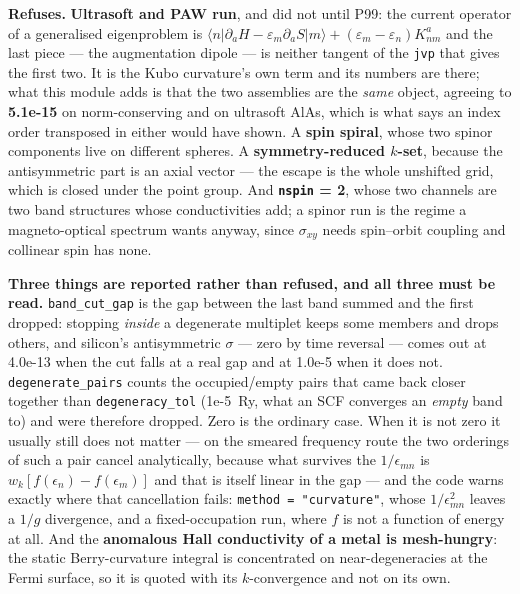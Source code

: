 \documentclass[11pt,a4paper]{article}
\newcommand{\code}[1]{\texttt{\small #1}}
\begin{document}
\begin{refuses}
\textbf{Refuses.} \textbf{Ultrasoft and PAW run}, and did not until P99: the
current operator of a generalised eigenproblem is $\langle n|\partial_a H -
\varepsilon_m \partial_a S|m\rangle + (\varepsilon_m-\varepsilon_n)K^a_{nm}$
and the last piece --- the augmentation dipole --- is neither tangent of the
\code{jvp} that gives the first two. It is the Kubo curvature's own term and
its numbers are there; what this module adds is that the two assemblies are the
\emph{same} object, agreeing to \textbf{5.1e-15} on norm-conserving and on
ultrasoft AlAs, which is what says an index order transposed in either would
have shown. A \textbf{spin spiral}, whose two spinor
components live on different spheres. A \textbf{symmetry-reduced $k$-set},
because the antisymmetric part is an axial vector --- the escape is the whole
unshifted grid, which is closed under the point group. And
\textbf{\code{nspin} = 2}, whose two channels are two band structures whose
conductivities add; a spinor run is the regime a magneto-optical spectrum wants
anyway, since $\sigma_{xy}$ needs spin--orbit coupling and collinear spin has
none.

\textbf{Three things are reported rather than refused, and all three must be
read.} \code{band\_cut\_gap} is the gap between the last band summed and the
first dropped: stopping \emph{inside} a degenerate multiplet keeps some members
and drops others, and silicon's antisymmetric $\sigma$ --- zero by time
reversal --- comes out at 4.0e-13 when the cut falls at a real gap and at
1.0e-5 when it does not. \code{degenerate\_pairs} counts the occupied/empty
pairs that came back closer together than \code{degeneracy\_tol} (1e-5~Ry,
what an SCF converges an \emph{empty} band to) and were therefore dropped.
Zero is the ordinary case. When it is not zero it usually still does not
matter --- on the smeared frequency route the two orderings of such a pair
cancel analytically, because what survives the $1/\epsilon_{mn}$ is
$w_k[f(\epsilon_n)-f(\epsilon_m)]$ and that is itself linear in the gap ---
and the code warns exactly where that cancellation fails: \code{method =
"curvature"}, whose $1/\epsilon_{mn}^2$ leaves a $1/g$ divergence, and a
fixed-occupation run, where $f$ is not a function of energy at all. And the
\textbf{anomalous Hall conductivity of a metal is mesh-hungry}: the static
Berry-curvature integral is concentrated on near-degeneracies at the Fermi
surface, so it is quoted with its $k$-convergence and not on its own.
\end{refuses}
\end{document}
